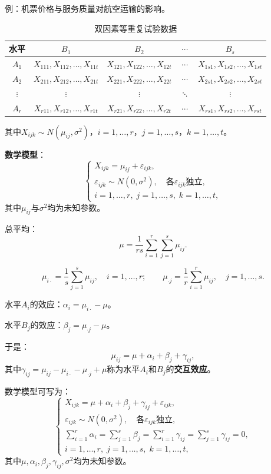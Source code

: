 \documentclass[11pt,a4paper]{report}
\theoremstyle{definition}
\begin{document}
例：机票价格与服务质量对航空运输的影响。

\begin{table}[htbp]
\centering
\caption{双因素等重复试验数据}
\begin{tabular}{@{}ccccc@{}}
\toprule
水平 & $B_{1}$ & $B_{2}$ & $\cdots$ & $B_{s}$ \\
\midrule
$A_{1}$ & $X_{111},X_{112},\ldots,X_{11t}$ & $X_{121},X_{122},\ldots,X_{12t}$ & $\cdots$ & $X_{1s1},X_{1s2},\ldots,X_{1st}$ \\
$A_{2}$ & $X_{211},X_{212},\ldots,X_{21t}$ & $X_{221},X_{222},\ldots,X_{22t}$ & $\cdots$ & $X_{2s1},X_{2s2},\ldots,X_{2st}$ \\
$\vdots$ & $\vdots$ & $\vdots$ & $\ddots$ & $\vdots$ \\
$A_{r}$ & $X_{r11},X_{r12},\ldots,X_{r1t}$ & $X_{r21},X_{r22},\ldots,X_{r2t}$ & $\cdots$ & $X_{rs1},X_{rs2},\ldots,X_{rst}$ \\
\bottomrule
\end{tabular}
\end{table}

其中$X_{ijk}\sim N(\mu_{ij},\sigma^{2})$，$i=1,\ldots,r$，$j=1,\ldots,s$，$k=1,\ldots,t$。

\textbf{数学模型}：
\[
\begin{cases}
X_{ijk}=\mu_{ij}+\varepsilon_{ijk},\\[0.3em]
\varepsilon_{ijk}\sim N(0,\sigma^{2}),\quad\text{各}\varepsilon_{ijk}\text{独立},\\[0.3em]
i=1,\ldots,r,\;j=1,\ldots,s,\;k=1,\ldots,t,
\end{cases}
\]
其中$\mu_{ij}$与$\sigma^{2}$均为未知参数。

总平均：
\[
\mu=\frac{1}{rs}\sum_{i=1}^{r}\sum_{j=1}^{s}\mu_{ij}.
\]

\[
\mu_{i\cdot}=\frac{1}{s}\sum_{j=1}^{s}\mu_{ij},\quad i=1,\ldots,r;\qquad
\mu_{\cdot j}=\frac{1}{r}\sum_{i=1}^{r}\mu_{ij},\quad j=1,\ldots,s.
\]

水平$A_{i}$的效应：$\alpha_{i}=\mu_{i\cdot}-\mu$。

水平$B_{j}$的效应：$\beta_{j}=\mu_{\cdot j}-\mu$。

于是：
\[
\mu_{ij}=\mu+\alpha_{i}+\beta_{j}+\gamma_{ij},
\]
其中$\gamma_{ij}=\mu_{ij}-\mu_{i\cdot}-\mu_{\cdot j}+\mu$称为水平$A_{i}$和$B_{j}$的\textbf{交互效应}。

数学模型可写为：
\[
\begin{cases}
X_{ijk}=\mu+\alpha_{i}+\beta_{j}+\gamma_{ij}+\varepsilon_{ijk},\\[0.3em]
\varepsilon_{ijk}\sim N(0,\sigma^{2}),\quad\text{各}\varepsilon_{ijk}\text{独立},\\[0.3em]
\displaystyle\sum_{i=1}^{r}\alpha_{i}=\sum_{j=1}^{s}\beta_{j}=\sum_{i=1}^{r}\gamma_{ij}=\sum_{j=1}^{s}\gamma_{ij}=0,\\[0.5em]
i=1,\ldots,r,\;j=1,\ldots,s,\;k=1,\ldots,t,
\end{cases}
\]
其中$\mu,\alpha_{i},\beta_{j},\gamma_{ij},\sigma^{2}$均为未知参数。
\end{document}
